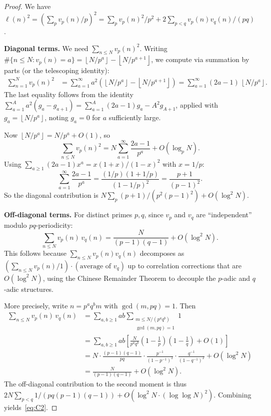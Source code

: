\documentclass[11pt,a4paper]{amsart}
\theoremstyle{plain}
\theoremstyle{definition}
\newcommand{\floor}[1]{\left\lfloor #1 \right\rfloor}
\begin{document}
\begin{proof}
We have $\ell(n)^2 = \left(\sum_p v_p(n)/p\right)^2 = \sum_p v_p(n)^2/p^2 + 2\sum_{p < q} v_p(n) v_q(n)/(pq)$.

\medskip
\noindent\textbf{Diagonal terms.}  We need $\sum_{n \le N} v_p(n)^2$.  Writing
$\#\{n \le N : v_p(n) = a\} = \floor{N/p^a} - \floor{N/p^{a+1}}$,
we compute via summation by parts (or the telescoping identity):
\begin{align*}
\sum_{n=1}^{N} v_p(n)^2
&= \sum_{a=1}^{\infty} a^2 \left(\floor{N/p^a} - \floor{N/p^{a+1}}\right)
= \sum_{a=1}^{\infty} (2a - 1)\,\floor{N/p^a}.
\end{align*}
The last equality follows from the identity $\sum_{a=1}^{A} a^2 (g_a - g_{a+1}) = \sum_{a=1}^{A}(2a-1)g_a - A^2 g_{A+1}$, applied with $g_a = \floor{N/p^a}$, noting $g_a = 0$ for $a$ sufficiently large.

Now $\floor{N/p^a} = N/p^a + O(1)$, so
\[
\sum_{n \le N} v_p(n)^2 = N \sum_{a=1}^{\infty} \frac{2a-1}{p^a} + O(\log_p N).
\]
Using $\sum_{a \ge 1} (2a-1) x^a = x(1+x)/(1-x)^2$ with $x = 1/p$:
\[
\sum_{a=1}^{\infty} \frac{2a-1}{p^a} = \frac{(1/p)(1 + 1/p)}{(1 - 1/p)^2} = \frac{p+1}{(p-1)^2}.
\]
So the diagonal contribution is $N \sum_p (p+1)/(p^2(p-1)^2) + O(\log^2 N)$.

\medskip
\noindent\textbf{Off-diagonal terms.}  For distinct primes $p, q$, since $v_p$ and $v_q$ are 
``independent'' modulo $pq$-periodicity:
\[
\sum_{n \le N} v_p(n)\,v_q(n) = \frac{N}{(p-1)(q-1)} + O(\log^2 N).
\]
This follows because $\sum_{n \le N} v_p(n) v_q(n)$ decomposes as 
$(\sum_{n \le N} v_p(n)/1) \cdot (\text{average of } v_q)$ up to correlation 
corrections that are $O(\log^2 N)$, using the Chinese Remainder Theorem to 
decouple the $p$-adic and $q$-adic structures.

More precisely, write $n = p^a q^b m$ with $\gcd(m, pq) = 1$.  Then
\begin{align*}
\sum_{n \le N} v_p(n)\,v_q(n) &= \sum_{a,b \ge 1} ab \sum_{\substack{m \le N/(p^a q^b) \\ \gcd(m,pq)=1}} 1 \\
&= \sum_{a,b \ge 1} ab \left[\frac{N}{p^a q^b}\left(1 - \frac{1}{p}\right)\!\left(1 - \frac{1}{q}\right) + O(1)\right] \\
&= N \cdot \frac{(p-1)(q-1)}{pq} \cdot \frac{p^{-1}}{(1-p^{-1})^2} \cdot \frac{q^{-1}}{(1-q^{-1})^2} + O(\log^2 N) \\
&= \frac{N}{(p-1)(q-1)} + O(\log^2 N).
\end{align*}
The off-diagonal contribution to the second moment is thus $2N \sum_{p<q} 1/(pq(p-1)(q-1)) + O(\log^2 N \cdot (\log\log N)^2)$.  Combining yields~\eqref{eq:C2}.
\end{proof}
\end{document}
